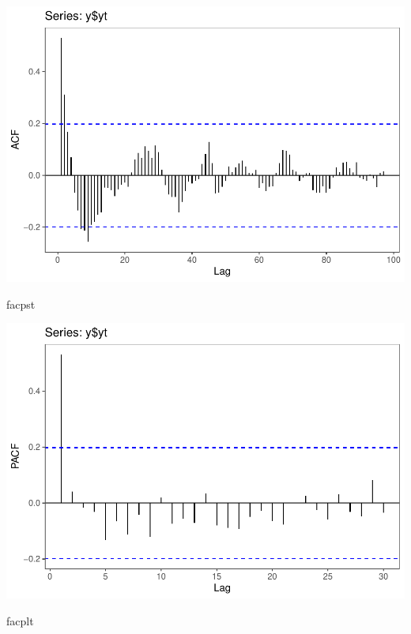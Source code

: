 \documentclass[
]{article}
\newenvironment{Shaded}{\begin{snugshade}}{\end{snugshade}}
\newcommand{\NormalTok}[1]{#1}
\begin{document}
\begin{center}\includegraphics{Econo2_P5_files/figure-latex/plots fac facp-2} \end{center}

\begin{Shaded}
\begin{Highlighting}[]
\NormalTok{facpst}
\end{Highlighting}
\end{Shaded}

\begin{center}\includegraphics{Econo2_P5_files/figure-latex/plots fac facp-3} \end{center}

\begin{Shaded}
\begin{Highlighting}[]
\NormalTok{facplt}
\end{Highlighting}
\end{Shaded}
\end{document}
